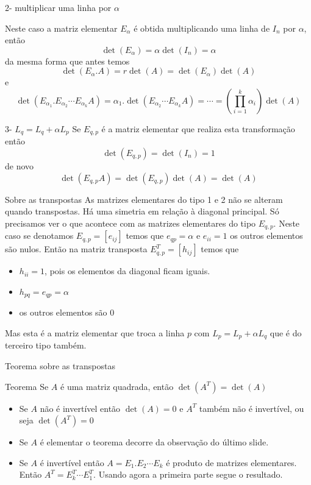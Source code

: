 \documentclass{beamer}
\begin{document}
  \begin{frame}{2- multiplicar uma linha por $\alpha$}

    Neste caso a matriz elementar $E_{\alpha}$ é obtida multiplicando uma linha de $I_n$ por
    $\alpha$, então
    $$\det(E_{\alpha})= \alpha\det(I_n)=\alpha $$
    da mesma forma que antes temos
    $$\det(E_\alpha.A)=r\det(A)=\det(E_\alpha)\det(A)$$
    e
    $$ \det(E_{\alpha_1}.E_{\alpha_2}\cdots E_{\alpha_k}A)=\alpha_1.\det(E_{\alpha_2}\cdots E_{\alpha_k}A)=\cdots = \left(\prod_{i=1}^k \alpha_i \right)\det(A)$$
    
  \end{frame}

  \begin{frame}{3- $L_q=L_q+ \alpha L_p$}
    Se $E_{q,p}$ é a matriz elementar que realiza esta transformação então
    $$ \det(E_{q,p})=\det(I_n)=1 $$
    de novo
    $$ \det(E_{q,p}A)= \det(E_{q,p})\det(A)=\det(A)$$

  \end{frame}
  \begin{frame}{Sobre as transpostas}
    As matrizes elementares do tipo 1 e 2 não se alteram quando transpostas. Há uma simetria em relação à
    diagonal principal. Só precisamos ver o que acontece com as matrizes elementares do tipo $E_{q,p}$.
    Neste caso se denotamos $E_{q,p}=[e_{ij}]$ temos que $e_{qp}=\alpha$ e $e_{ii}=1$ os outros elementos são nulos.
    Então na matriz transposta $E_{q,p}^T=[h_{ij}]$ temos que 
    \begin{itemize}
      \item $h_{ii}=1$, pois os elementos da diagonal ficam iguais.
      \item $h_{pq}=e_{qp}=\alpha$
      \item os outros elementos são $0$
    \end{itemize}
    Mas esta é a matriz elementar que troca a linha $p$ com $L_p=L_p+\alpha L_q$ que é do terceiro tipo também.
  \end{frame}

  \begin{frame}{Teorema sobre as transpostas}
    \begin{block}{Teorema}
      Se $A$ é uma matriz quadrada, então $\det(A^T) = \det(A)$ 
    \end{block}
    \begin{itemize}
      \item Se $A$ não é invertível então $\det(A)=0$ e $A^T$ também não é invertível, ou seja $\det(A^T)=0$
      \item Se $A$ é elementar o teorema decorre da observação do último slide.
      \item Se $A$ é invertível então $A=E_1.E_2\cdots E_k$ é produto de matrizes elementares. Então $A^T = E_k^T\cdots E_1^T$. Usando agora a primeira parte segue o resultado.
    \end{itemize}
    \end{frame}
\end{document}
